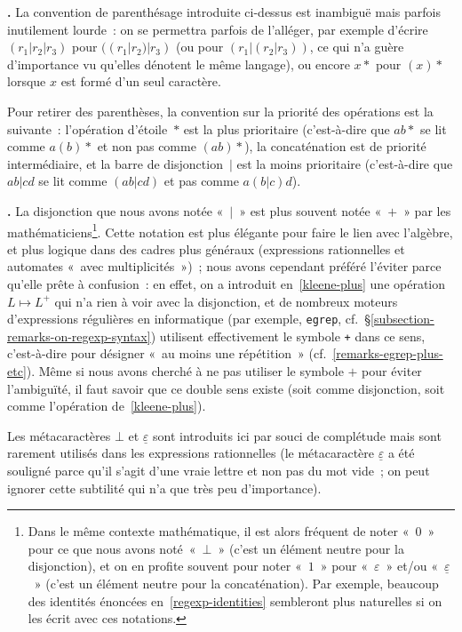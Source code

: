 \documentclass[12pt,a4paper]{article}
\theoremstyle{definition}
\newcommand\thingy{%
\refstepcounter{comcnt}\medskip\noindent\textbf{\thecomcnt.} }
\begin{document}
\thingy\label{convention-on-writing-regexps}
La convention de parenthésage introduite ci-dessus est
inambiguë mais parfois inutilement lourde : on se permettra parfois de
l'alléger, par exemple d'écrire $(r_1|r_2|r_3)$ pour $((r_1|r_2)|r_3)$
(ou pour $(r_1|(r_2|r_3))$, ce qui n'a guère d'importance vu qu'elles
dénotent le même langage), ou encore $x{*}$ pour $(x){*}$ lorsque $x$
est formé d'un seul caractère.

Pour retirer des parenthèses, la convention sur la priorité des
opérations est la suivante : l'opération d'étoile ${*}$ est la plus
prioritaire (c'est-à-dire que $ab{*}$ se lit comme $a(b){*}$ et non
pas comme $(ab){*}$), la concaténation est de priorité intermédiaire,
et la barre de disjonction $|$ est la moins prioritaire (c'est-à-dire
que $ab|cd$ se lit comme $(ab|cd)$ et pas comme $a(b|c)d$).

\thingy\label{regexp-notation-variations} La disjonction que nous
avons notée « ${|}$ » est plus souvent notée « $+$ » par les
mathématiciens\footnote{Dans le même contexte mathématique, il est
  alors fréquent de noter « $0$ » pour ce que nous avons
  noté « $\bot$ » (c'est un élément neutre pour la disjonction), et on
  en profite souvent pour noter « $1$ » pour « $\varepsilon$ » et/ou
  « $\underline{\varepsilon}$ » (c'est un élément neutre pour la
  concaténation).  Par exemple, beaucoup des identités énoncées
  en \ref{regexp-identities} sembleront plus naturelles si on les
  écrit avec ces notations.}.  Cette notation est plus élégante pour
faire le lien avec l'algèbre, et plus logique dans des cadres plus
généraux (expressions rationnelles et automates « avec
multiplicités ») ; nous avons cependant préféré l'éviter parce qu'elle
prête à confusion : en effet, on a introduit en \ref{kleene-plus} une
opération $L \mapsto L^+$ qui n'a rien à voir avec la disjonction, et
de nombreux moteurs d'expressions régulières en informatique (par
exemple, \texttt{egrep},
cf. §\ref{subsection-remarks-on-regexp-syntax}) utilisent
effectivement le symbole \texttt{+} dans ce sens, c'est-à-dire pour
désigner « au moins une répétition »
(cf. \ref{remarks-egrep-plus-etc}).  Même si nous avons cherché à ne
pas utiliser le symbole $+$ pour éviter l'ambiguïté, il faut savoir
que ce double sens existe (soit comme disjonction, soit comme
l'opération de \ref{kleene-plus}).

{\footnotesize Les métacaractères $\bot$ et $\underline{\varepsilon}$
  sont introduits ici par souci de complétude mais sont rarement
  utilisés dans les expressions rationnelles (le métacaractère
  $\underline{\varepsilon}$ a été souligné parce qu'il s'agit d'une
  vraie lettre et non pas du mot vide ; on peut ignorer cette
  subtilité qui n'a que très peu d'importance).\par}
\end{document}
